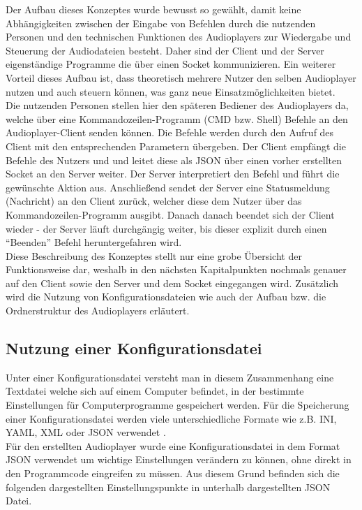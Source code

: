Der Aufbau dieses Konzeptes wurde bewusst so gewählt, damit keine Abhängigkeiten zwischen der  Eingabe von Befehlen durch die nutzenden Personen und den technischen Funktionen des Audioplayers zur Wiedergabe und Steuerung der Audiodateien besteht. Daher sind der Client und der Server eigenständige Programme die über einen Socket kommunizieren. Ein weiterer Vorteil dieses Aufbau ist, dass theoretisch mehrere Nutzer den selben Audioplayer nutzen und auch steuern können, was ganz neue Einsatzmöglichkeiten bietet. \\
Die nutzenden Personen stellen hier den späteren Bediener des Audioplayers da, welche über eine Kommandozeilen-Programm (\ac{CMD} bzw. Shell) Befehle an den Audioplayer-Client senden können. Die Befehle werden durch den Aufruf des Client mit den entsprechenden Parametern übergeben. Der Client empfängt die Befehle des Nutzers und und leitet diese als \ac{JSON} über einen vorher erstellten Socket an den Server weiter. Der Server interpretiert den Befehl und führt die gewünschte Aktion aus. Anschließend sendet der Server eine Statusmeldung (Nachricht) an den Client zurück, welcher diese dem Nutzer über das Kommandozeilen-Programm ausgibt. Danach danach beendet sich der Client wieder - der Server läuft durchgängig weiter, bis dieser explizit durch einen \enquote{Beenden} Befehl heruntergefahren wird. \\
Diese Beschreibung des Konzeptes stellt nur eine grobe Übersicht der Funktionsweise dar, weshalb in den nächsten Kapitalpunkten nochmals genauer auf den Client sowie den Server und dem Socket eingegangen wird. Zusätzlich wird die Nutzung von Konfigurationsdateien wie auch der Aufbau bzw. die Ordnerstruktur des Audioplayers erläutert.

\subsection{Nutzung einer Konfigurationsdatei}
Unter einer Konfigurationsdatei versteht man in diesem Zusammenhang eine Textdatei welche sich auf einem Computer befindet, in der bestimmte Einstellungen für Computerprogramme gespeichert werden. Für die Speicherung einer Konfigurationsdatei werden viele unterschiedliche Formate wie z.B. \ac{INI}, \ac{YAML}, \ac{XML} oder \ac{JSON} verwendet \autocite{hard_coding_and_soft_coding_2019} \autocite{lott_2019}. \\ Für den erstellten Audioplayer wurde eine Konfigurationsdatei in dem Format \ac{JSON} verwendet um wichtige Einstellungen verändern zu können, ohne direkt in den Programmcode eingreifen zu müssen. Aus diesem Grund befinden sich die folgenden dargestellten Einstellungspunkte in unterhalb dargestellten \ac{JSON} Datei. 

